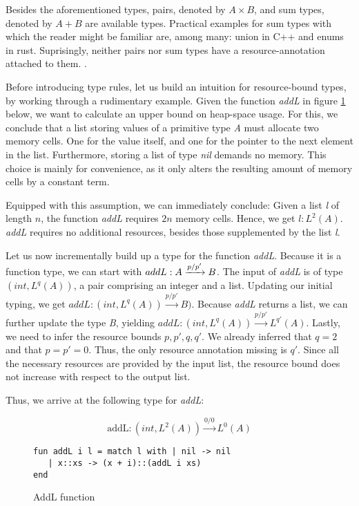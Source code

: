 Besides the aforementioned types, pairs, denoted by \(A \times B\), and sum types, denoted by \(A + B\) are available types. Practical examples for sum types with which the reader might be familiar are, among many: union in C++ and enums in rust. 
Suprisingly, neither pairs nor sum types have a resource-annotation attached to them. .

Before introducing type rules, let us build an intuition for resource-bound types, by working through a rudimentary example. Given the function \emph{addL} in figure \ref{func:add-l} below, we want to calculate an upper bound on heap-space usage. For this, we conclude that a list storing values of a primitive type \emph{A} must allocate two memory cells. One for the value itself, and one for the pointer to the next element in the list. Furthermore, storing a list of type \emph{nil} demands no memory.
This choice is mainly for convenience, as it only alters the resulting amount of memory cells by a constant term.

Equipped with this assumption, we can immediately conclude: Given a list \emph{l} of length \(n\), the function \emph{addL} requires \(2n\) memory cells. Hence, we get \(l : L^{2}(A)\). \emph{addL} requires no additional resources, besides those supplemented by the list \emph{l}. 

Let us now incrementally build up a type for the function \emph{addL}. Because it is a function type, we can start with \(addL: A \xrightarrow{p/p'} B\). The input of \emph{addL} is of type \((int, L^{q}(A))\), a pair comprising an integer and a list. Updating our initial typing, we get \(addL : (int, L^{q}(A)) \xrightarrow{p/p'} B)\). Because \emph{addL} returns a list, we can further update the type \emph{B}, yielding \(addL: (int, L^{q}(A)) \xrightarrow{p/p'} L^{q'}(A)\). Lastly, we need to infer the resource bounds \(p, p', q, q'\). We already inferred that \(q = 2\) and that \(p = p' = 0\). Thus, the only resource annotation missing is \(q'\). Since all the necessary resources are provided by the input list, the resource bound does not increase with respect to the output list. 

Thus, we arrive at the following type for \emph{addL}:

\[\text{addL}: (int, L^{2}(A)) \xrightarrow{0/0} L^{0}(A) \]

\begin{figure}[H]
\centering
\begin{verbatim}
fun addL i l = match l with | nil -> nil
   | x::xs -> (x + i)::(addL i xs)
end
\end{verbatim}
\caption{AddL function}
\label{func:add-l}
\end{figure}

